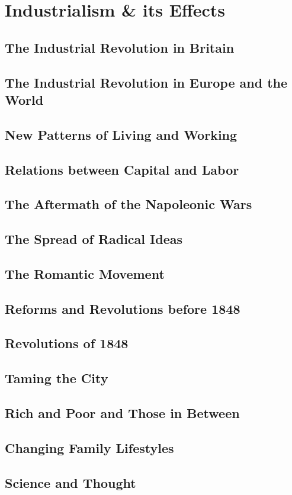 \documentclass[../euro.tex]{subfiles}
\begin{document}
\chapter{Industrialism \& its Effects}
\section{The Industrial Revolution in Britain}
\section{The Industrial Revolution in Europe and the World}
\section{New Patterns of Living and Working}
\section{Relations between Capital and Labor}
\section{The Aftermath of the Napoleonic Wars}
\section{The Spread of Radical Ideas}
\section{The Romantic Movement}
\section{Reforms and Revolutions before 1848}
\section{Revolutions of 1848}
\section{Taming the City}
\section{Rich and Poor and Those in Between}
\section{Changing Family Lifestyles}
\section{Science and Thought}
\end{document}
